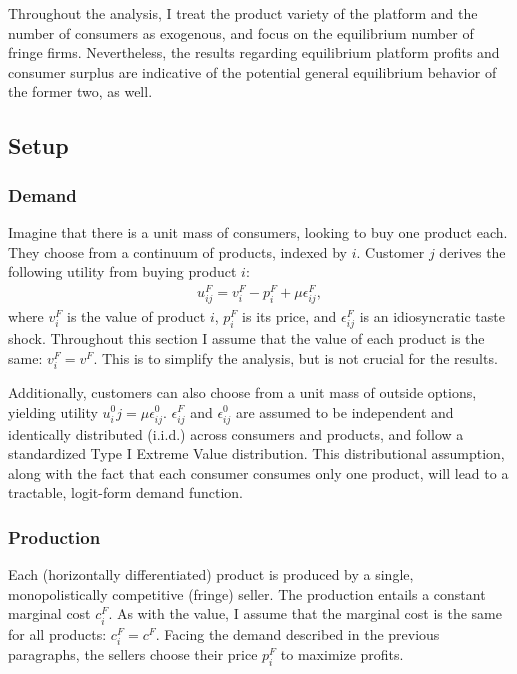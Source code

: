\documentclass[a4paper]{article}
\begin{document}
Throughout the analysis, I treat the product variety of the platform and the number of consumers as exogenous, and focus on the equilibrium number of fringe firms.
Nevertheless, the results regarding equilibrium platform profits and consumer surplus are indicative of the potential general equilibrium behavior of the former two, as well.

\subsection{Setup}

\subsubsection{Demand}

Imagine that there is a unit mass of consumers, looking to buy one product each.
They choose from a continuum of products, indexed by $i$.
Customer $j$ derives the following utility from buying product $i$:
\begin{align*}
    u^F_{ij} = v^F_i - p^F_i + \mu\epsilon^F_{ij},
\end{align*}
where $v^F_i$ is the value of product $i$, $p^F_i$ is its price, and $\epsilon^F_{ij}$ is an idiosyncratic taste shock.
Throughout this section I assume that the value of each product is the same: $v^F_i = v^F$.
This is to simplify the analysis, but is not crucial for the results.

Additionally, customers can also choose from a unit mass of outside options, yielding utility $u^0_ij = \mu\epsilon^0_{ij}$. $\epsilon^F_{ij}$ and $\epsilon^0_{ij}$ are assumed to be independent and identically distributed (i.i.d.) across consumers and products, and follow a standardized Type I Extreme Value distribution. This distributional assumption, along with the fact that each consumer consumes only one product, will lead to a tractable, logit-form demand function.

\subsubsection{Production}

Each (horizontally differentiated) product is produced by a single, monopolistically competitive (fringe) seller.
The production entails a constant marginal cost $c^F_i$.
As with the value, I assume that the marginal cost is the same for all products: $c^F_i = c^F$.
Facing the demand described in the previous paragraphs, the sellers choose their price $p^F_i$ to maximize profits.
\end{document}
